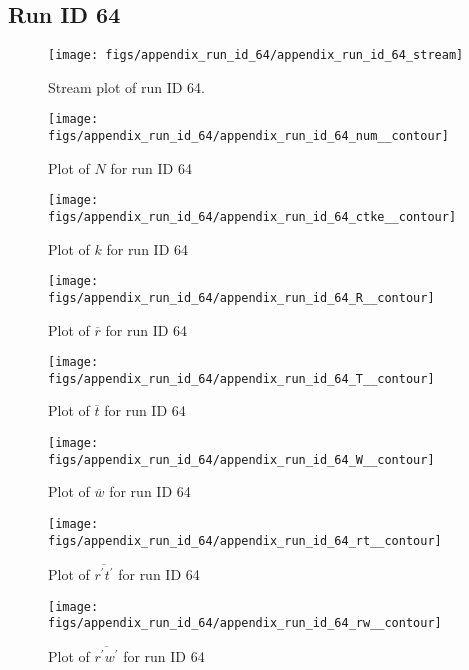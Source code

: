 \subsection{Run ID 64}
\begin{figure}[H]
\centering
\texttt{[image: figs/appendix\_run\_id\_64/appendix\_run\_id\_64\_stream]}
\caption{Stream plot of run ID 64.}
\label{fig:appendix_run_id_64_stream}
\end{figure}


\begin{figure}[H]
\centering
\texttt{[image: figs/appendix\_run\_id\_64/appendix\_run\_id\_64\_num\_\_contour]}
\caption{Plot of $N$ for run ID 64}
\label{fig:appendix_run_id_64_num__contour}
\end{figure}


\begin{figure}[H]
\centering
\texttt{[image: figs/appendix\_run\_id\_64/appendix\_run\_id\_64\_ctke\_\_contour]}
\caption{Plot of $k$ for run ID 64}
\label{fig:appendix_run_id_64_ctke__contour}
\end{figure}


\begin{figure}[H]
\centering
\texttt{[image: figs/appendix\_run\_id\_64/appendix\_run\_id\_64\_R\_\_contour]}
\caption{Plot of $\overline{r}$ for run ID 64}
\label{fig:appendix_run_id_64_R__contour}
\end{figure}


\begin{figure}[H]
\centering
\texttt{[image: figs/appendix\_run\_id\_64/appendix\_run\_id\_64\_T\_\_contour]}
\caption{Plot of $\overline{t}$ for run ID 64}
\label{fig:appendix_run_id_64_T__contour}
\end{figure}


\begin{figure}[H]
\centering
\texttt{[image: figs/appendix\_run\_id\_64/appendix\_run\_id\_64\_W\_\_contour]}
\caption{Plot of $\overline{w}$ for run ID 64}
\label{fig:appendix_run_id_64_W__contour}
\end{figure}


\begin{figure}[H]
\centering
\texttt{[image: figs/appendix\_run\_id\_64/appendix\_run\_id\_64\_rt\_\_contour]}
\caption{Plot of $\overline{r^\prime t^\prime}$ for run ID 64}
\label{fig:appendix_run_id_64_rt__contour}
\end{figure}


\begin{figure}[H]
\centering
\texttt{[image: figs/appendix\_run\_id\_64/appendix\_run\_id\_64\_rw\_\_contour]}
\caption{Plot of $\overline{r^\prime w^\prime}$ for run ID 64}
\label{fig:appendix_run_id_64_rw__contour}
\end{figure}


